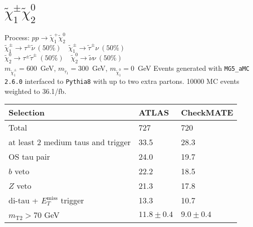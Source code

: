 \documentclass[12pt,fleqn]{article}
\begin{document}
\section{$\tilde{\chi}^\pm_1 \tilde{\chi}^0_2$}
 Process: $ p p \to \tilde{\chi}^+_1 \tilde{\chi}^0_2$\\
 $\tilde{\chi}_1^\pm \to \tau^\pm \tilde{\nu}\ (50\%) \quad \tilde{\chi}^\pm_1 \to \tilde{\tau}^\pm {\nu}\ (50\%) $ \\
 $\tilde{\chi}_2^0 \to \tau^\pm \tilde{\tau}^\pm\ (50\%) \quad \tilde{\chi}^0_2 \to \tilde{\nu} {\nu}\ (50\%) $ \\
 $m_{\tilde{\chi}_1^\pm} = 600$~GeV, $m_{\tilde{\tau}_1} = 300$~GeV, $m_{\tilde{\chi}_1^0} = 0$~GeV
 Events generated with \texttt{MG5\_aMC 2.6.0} interfaced to \texttt{Pythia8} with up to two extra partons.
 10000 MC events weighted to 36.1/fb.

\begin{table}[h!] 
 \renewcommand*{\arraystretch}{1.2}
 \begin{tabular}{l|p{3cm}|p{3cm}} \toprule
  Selection                                                                       & ATLAS    & CheckMATE       \\ \midrule
  Total                                                                           & 727    &  720          \\
  at least 2 medium taus and trigger                                              & 33.5        &  28.3  \\
  OS tau pair                                                                     & 24.0        &  19.7  \\
  $b$ veto                                                                        & 22.2        &  18.5  \\
  $Z$ veto                                                                        & 21.3        &  17.8  \\ \midrule
  di-tau + $E_T^\mathrm{miss}$ trigger                                            & 13.3        &  10.7  \\ 
  $m_\mathrm{T2} > 70$ GeV                                                        & $11.8\pm0.4$     &  $9.0\pm0.4$    \\ \bottomrule
 \end{tabular}
\end{table} 
  



 
\end{document}
